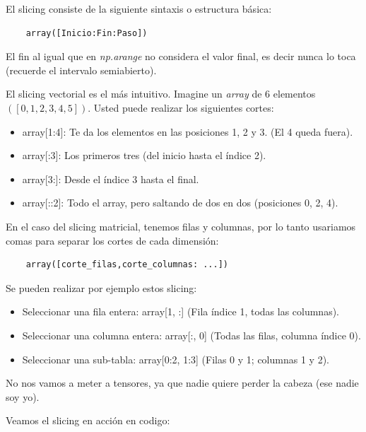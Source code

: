 El slicing consiste de la siguiente sintaxis o estructura básica:
\begin{verbatim}
    array([Inicio:Fin:Paso])
\end{verbatim}
\begin{nota}
    El fin al igual que en \textit{np.arange} no considera el valor final, es decir nunca lo toca (recuerde el intervalo semiabierto).
\end{nota}

El slicing vectorial es el más intuitivo. Imagine un \textit{array} de 6 elementos \((\left[0,1,2,3,4,5\right])\). Usted puede realizar los siguientes cortes:
\begin{itemize}
    \item array[1:4]: Te da los elementos en las posiciones 1, 2 y 3. (El 4 queda fuera).
    \item array[:3]: Los primeros tres (del inicio hasta el índice 2).
    \item array[3:]: Desde el índice 3 hasta el final.
    \item array[::2]: Todo el array, pero saltando de dos en dos (posiciones 0, 2, 4).
\end{itemize}

En el caso del slicing matricial, tenemos filas y columnas, por lo tanto usariamos comas para separar los cortes de cada dimensión:
\begin{verbatim}
    array([corte_filas,corte_columnas: ...])
\end{verbatim}
Se pueden realizar por ejemplo estos slicing:
\begin{itemize}
    \item Seleccionar una fila entera: array[1, :] (Fila índice 1, todas las columnas).
    \item Seleccionar una columna entera: array[:, 0] (Todas las filas, columna índice 0).
    \item Seleccionar una sub-tabla: array[0:2, 1:3] (Filas 0 y 1; columnas 1 y 2).
\end{itemize}

No nos vamos a meter a tensores, ya que nadie quiere perder la cabeza (ese nadie soy yo).

Veamos el slicing en acción en codigo:

